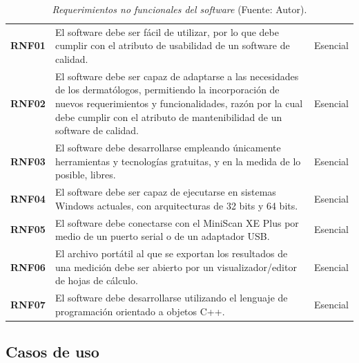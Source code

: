 	\begin{table}[h]
		\small
		\caption[Requerimientos no funcionales del software]{\textit{Requerimientos no funcionales del software} (Fuente: Autor).}
		\centering
		\setlength{\extrarowheight}{\altocelda}
		\begin{tabulary}{\anchotabla}{|c|J|c|}
			\hline
			 &  & \\ \hline
			\textbf{RNF01} & El software debe ser f\'{a}cil de utilizar, por lo que debe cumplir con el atributo de usabilidad de un software de calidad. & Esencial\\ \hline
			\textbf{RNF02} & El software debe ser capaz de adaptarse a las necesidades de los dermat\'{o}logos, permitiendo la incorporaci\'{o}n de nuevos requerimientos y funcionalidades, raz\'{o}n por la cual debe cumplir con el atributo de mantenibilidad de un software de calidad. & Esencial\\ \hline
			\textbf{RNF03} & El software debe desarrollarse empleando \'{u}nicamente herramientas y tecnolog\'{i}as gratuitas, y en la medida de lo posible, libres. & Esencial\\ \hline
			\textbf{RNF04} & El software debe ser capaz de ejecutarse en sistemas Windows actuales, con arquitecturas de 32 bits y 64 bits. & Esencial\\ \hline
			\textbf{RNF05} & El software debe conectarse con el MiniScan XE Plus por medio de un puerto serial o de un adaptador USB. & Esencial\\ \hline
			\textbf{RNF06} & El archivo port\'{a}til al que se exportan los resultados de una medici\'{o}n debe ser abierto por un visualizador/editor de hojas de c\'{a}lculo. & Esencial\\ \hline
			\textbf{RNF07} & El software debe desarrollarse utilizando el lenguaje de programaci\'{o}n orientado a objetos C++. & Esencial\\ \hline
		\end{tabulary}
	\end{table}
	
\newpage

\subsection{Casos de uso}

